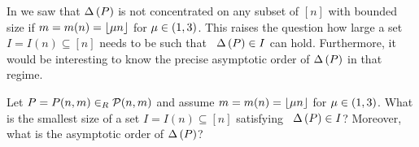 In  we saw that $\Delta\left(P\right)$ is not concentrated on any subset of $[n]$ with bounded size if $m=m(n)=\left\lfloor\mu n\right\rfloor$ for $\mu \in(1,3)$. This raises the question how large a set $I=I(n)\subseteq[n]$ needs to be such that \whp\ $\Delta\left(P\right)\in I$ can hold. Furthermore, it would be interesting to know the precise asymptotic order of $\Delta\left(P\right)$ in that regime.
\begin{question}
Let $P=P(n,m)\in_R \mathcal{P}(n,m)$ and assume $m=m(n)=\left\lfloor\mu n\right\rfloor$ for $\mu \in(1,3)$. What is the smallest size of a set $I=I(n)\subseteq[n]$ satisfying \whp\ $\Delta\left(P\right)\in I$? Moreover, what is the asymptotic order of $\Delta\left(P\right)$?
\end{question}


